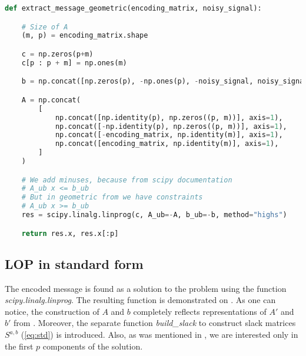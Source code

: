 \documentclass{article}
\begin{document}
\begin{lstlisting}[language=Python, caption={Message decryption based on solution of LOP in geometric form. The output is tuple of solution of the problem, and decrypted message itself}, label={lst:geom}]
  def extract_message_geometric(encoding_matrix, noisy_signal):

    # Size of A
    (m, p) = encoding_matrix.shape

    c = np.zeros(p+m)
    c[p : p + m] = np.ones(m)

    b = np.concat([np.zeros(p), -np.ones(p), -noisy_signal, noisy_signal])

    A = np.concat(
        [
            np.concat([np.identity(p), np.zeros((p, m))], axis=1),
            np.concat([-np.identity(p), np.zeros((p, m))], axis=1),
            np.concat([-encoding_matrix, np.identity(m)], axis=1),
            np.concat([encoding_matrix, np.identity(m)], axis=1),
        ]
    )

    # We add minuses, because from scipy documentation
    # A_ub x <= b_ub
    # But in geometric from we have constraints
    # A_ub x >= b_ub
    res = scipy.linalg.linprog(c, A_ub=-A, b_ub=-b, method="highs")

    return res.x, res.x[:p]
\end{lstlisting}


\subsection{LOP in standard form}
The encoded message is found as a solution to the problem  using the function \textit{scipy.linalg.linprog}. The resulting function is demonstrated on . As one can notice, the construction of $A$ and $b$ completely reflects representations of $A'$ and $b'$ from .
Moreover, the separate function \textit{build\_slack} to construct slack matrices $S^{a,b}$ (\cref{eq:std}) is introduced.
Also, as was mentioned in , we are interested only in the first $p$ components of the solution.
\end{document}
